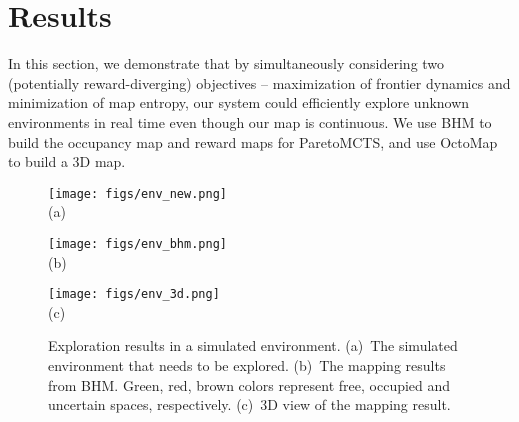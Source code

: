 \vspace{-15pt}
\section{Results}\label{sec:results}
In this section, we demonstrate that by simultaneously considering two (potentially reward-diverging) objectives -- maximization of frontier dynamics and minimization of map entropy, our system could efficiently explore unknown environments in real time even though our map is continuous. We use BHM to build the occupancy map and reward maps for ParetoMCTS, and use OctoMap~\cite{hornung2013octomap} to build a 3D map. 

\begin{figure}[h]
\centering
    \begin{minipage}[tb]{0.25\linewidth}
        \centering
        \texttt{[image: figs/env\_new.png]}\\(a)
        \label{fig:env}
    \end{minipage}
    \begin{minipage}[tb]{0.25\linewidth}
        \centering
        \texttt{[image: figs/env\_bhm.png]}\\(b)
        \label{fig:env_bhm}
    \end{minipage}
    \begin{minipage}[tb]{0.25\linewidth}
        \centering
        \texttt{[image: figs/env\_3d.png]}\\(c)
        \label{fig:env_3d}
    \end{minipage}
    \caption{\small
        Exploration results in a simulated environment. (a)~The simulated environment that needs to be explored. (b)~The mapping results from BHM. Green, red, brown colors represent free, occupied and uncertain spaces, respectively. (c)~3D view of the mapping result. %
        \vspace{-10pt}
    }
    \label{fig:exploration_results}
\end{figure}

